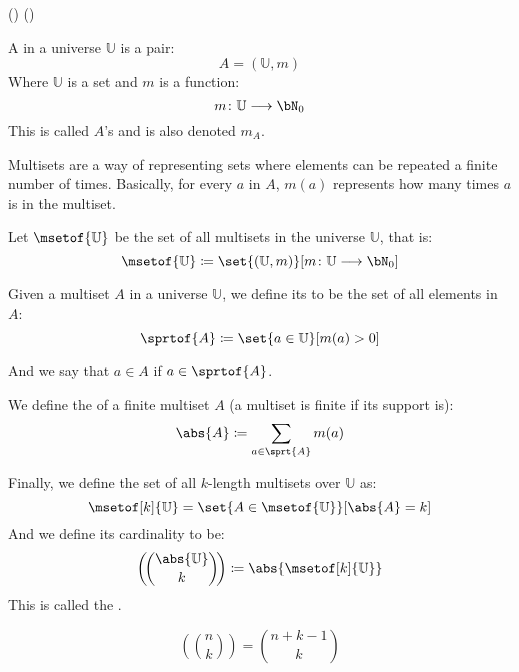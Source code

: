 ({})
({})
\def\bU{\mathbb{U}}
\def\msetcoeff#1#2{\left(\!\binom{#1}{#2}\!\right)}

\begin{defn*}

	A  in a universe $\bU$ is a pair:
	\[ A=(\bU, m) \]
	Where $\bU$ is a set and $m$ is a function:
	\[ m\colon \bU\longrightarrow\bN_0 \]
	This is called $A$'s  and is also denoted $m_A$.
	
	Multisets are a way of representing sets where elements can be repeated a finite number of times.
	Basically, for every $a$ in $A$, $m(a)$ represents how many times $a$ is in the multiset.

	Let $\msetof{\bU}$ be the set of all multisets in the universe $\bU$, that is:
	\[ \msetof{\bU}\coloneqq\set{(\bU, m)}[m\colon \bU\longrightarrow\bN_0] \]

	Given a multiset $A$ in a universe $\bU$, we define its  to be the set of all elements in $A$:
	\[ \sprtof{A}\coloneqq\set{a\in\bU}[m(a)>0] \]

	And we say that $a\in A$ if $a\in\sprtof{A}$.

	We define the  of a finite multiset $A$ (a multiset is finite if its support is):
	\[ \abs{A}\coloneqq\sum_{a\in\sprt{A}}m(a) \]

	Finally, we define the set of all $k$-length multisets over $\bU$ as:
	\[ \msetof[k]{\bU} = \set{A\in\msetof{\bU}}[\abs{A}=k] \]
	And we define its cardinality to be:
	\[ \msetcoeff{\abs{\bU}}{k}\coloneqq\abs{\msetof[k]{\bU}} \]
	This is called the .

\end{defn*}

\begin{prop*}

	\[ \msetcoeff{n}{k} = \binom{n+k-1}{k} \]

\end{prop*}

